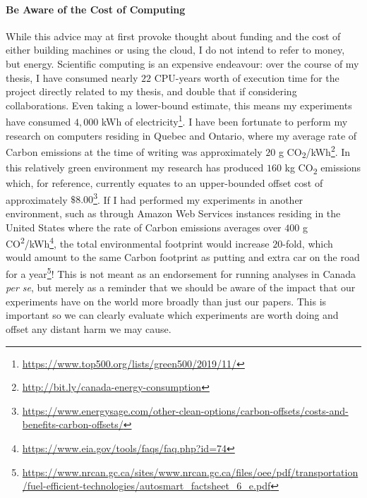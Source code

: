 \paragraph*{Be Aware of the Cost of Computing}
While this advice may at first provoke thought about funding and the cost of either building machines or using the
cloud, I do not intend to refer to money, but energy. Scientific computing is an expensive endeavour: over the course
of my thesis, I have consumed nearly $22$ CPU-years worth of execution time for the project directly related to my
thesis, and double that if considering collaborations. Even taking a lower-bound estimate, this means my experiments
have consumed $4,000$ kWh of electricity\footnote{\url{https://www.top500.org/lists/green500/2019/11/}}. I have been
fortunate to perform my research on computers residing in Quebec and Ontario, where my average rate of Carbon
emissions at the time of writing was approximately $20$ g CO\textsubscript{2}/kWh\footnote{\url{http://bit.ly/canada-energy-consumption}}.
In this relatively green environment my research has produced $160$ kg CO\textsubscript{2} emissions which, for
reference, currently equates to an upper-bounded offset cost of approximately $\$8.00$\footnote{\url{https://www.energysage.com/other-clean-options/carbon-offsets/costs-and-benefits-carbon-offsets/}}.
If I had performed my experiments in another environment, such as through Amazon Web Services instances residing in
the United States where the rate of Carbon emissions averages over $400$ g CO\textsuperscript{2}/kWh\footnote{\url{https://www.eia.gov/tools/faqs/faq.php?id=74}},
the total environmental footprint would increase $20$-fold, which would amount to the same Carbon footprint as putting
and extra car on the road for a year\footnote{\url{https://www.nrcan.gc.ca/sites/www.nrcan.gc.ca/files/oee/pdf/transportation/fuel-efficient-technologies/autosmart_factsheet_6_e.pdf}}!
This is not meant as an endorsement for running analyses in Canada \textit{per se}, but merely as a reminder that we
should be aware of the impact that our experiments have on the world more broadly than just our papers. This is
important so we can clearly evaluate which experiments are worth doing and offset any distant harm we may cause.

